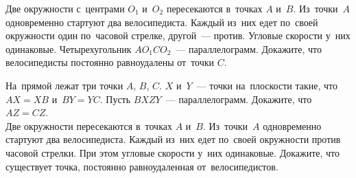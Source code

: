 \begin{problems}
\item
Две окружности с~центрами $O_1$ и~$O_2$ пересекаются в~точках $A$ и~$B$.
Из~точки~$A$ одновременно стартуют два велосипедиста.
Каждый из~них едет по~своей окружности один по~часовой стрелке,
другой~--- против.
Угловые скорости у~них одинаковые.
Четырехугольник $A O_1 C O_2$~--- параллелограмм.
Докажите, что велосипедисты постоянно равноудалены от~точки $C$.

\item
\subproblem
На~прямой лежат три точки $A$, $B$, $C$.
$X$ и~$Y$~--- точки на~плоскости такие, что $AX = XB$ и~$BY = YC$.
Пусть $BXZY$~--- параллелограмм.
Докажите, что $AZ = CZ$.
\\
\subproblem
Две окружности пересекаются в~точках $A$ и~$B$.
Из~точки~$A$ одновременно стартуют два велосипедиста.
Каждый из~них едет по~своей окружности против часовой стрелки.
При этом угловые скорости у~них одинаковые.
Докажите, что существует точка, постоянно равноудаленная от~велосипедистов.

\end{problems}

